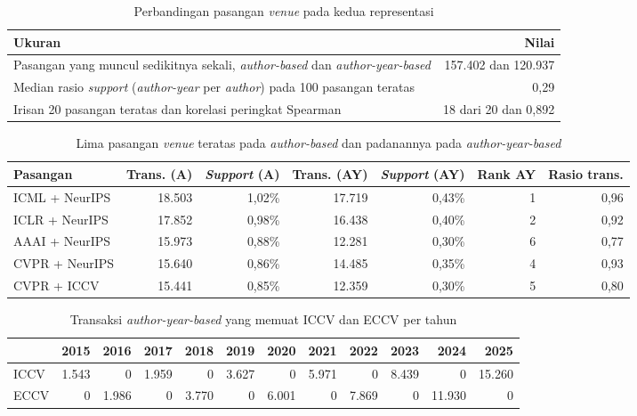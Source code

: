 \begin{table}[!htb]
\caption{Perbandingan pasangan \textit{venue} pada kedua representasi}
\label{tab:banding-repr}
\small
\begin{tabular*}{\textwidth}{@{\extracolsep{\fill}}@{}lr@{}}
\toprule
\textbf{Ukuran} & \textbf{Nilai} \\
\midrule
Pasangan yang muncul sedikitnya sekali, \textit{author-based} dan \textit{author-year-based} & 157.402 dan 120.937 \\
Median rasio \textit{support} (\textit{author-year} per \textit{author}) pada 100 pasangan teratas & 0,29 \\
Irisan 20 pasangan teratas dan korelasi peringkat Spearman & 18 dari 20 dan 0,892 \\
\bottomrule
\end{tabular*}
\end{table}

\begin{table}[!htb]
\caption{Lima pasangan \textit{venue} teratas pada \textit{author-based} dan padanannya pada \textit{author-year-based}}
\label{tab:top-pasangan}
\footnotesize
\begin{tabularx}{\textwidth}{@{}>{\raggedright\arraybackslash}X rrrrrr@{}}
\toprule
\textbf{Pasangan} & \textbf{Trans. (A)} & \textbf{\textit{Support} (A)} & \textbf{Trans. (AY)} & \textbf{\textit{Support} (AY)} & \textbf{Rank AY} & \textbf{Rasio trans.} \\
\midrule
ICML + NeurIPS & 18.503 & 1,02\% & 17.719 & 0,43\% & 1 & 0,96 \\
ICLR + NeurIPS & 17.852 & 0,98\% & 16.438 & 0,40\% & 2 & 0,92 \\
AAAI + NeurIPS & 15.973 & 0,88\% & 12.281 & 0,30\% & 6 & 0,77 \\
CVPR + NeurIPS & 15.640 & 0,86\% & 14.485 & 0,35\% & 4 & 0,93 \\
CVPR + ICCV & 15.441 & 0,85\% & 12.359 & 0,30\% & 5 & 0,80 \\
\bottomrule
\end{tabularx}
\end{table}

\begin{table}[!htb]
\caption{Transaksi \textit{author-year-based} yang memuat ICCV dan ECCV per tahun}
\label{tab:iccv}
\footnotesize
\setlength{\tabcolsep}{3.5pt}
\begin{tabular*}{\textwidth}{@{\extracolsep{\fill}}@{}lrrrrrrrrrrr@{}}
\toprule
 & \textbf{2015} & \textbf{2016} & \textbf{2017} & \textbf{2018} & \textbf{2019} & \textbf{2020} & \textbf{2021} & \textbf{2022} & \textbf{2023} & \textbf{2024} & \textbf{2025} \\
\midrule
ICCV & 1.543 & 0 & 1.959 & 0 & 3.627 & 0 & 5.971 & 0 & 8.439 & 0 & 15.260 \\
ECCV & 0 & 1.986 & 0 & 3.770 & 0 & 6.001 & 0 & 7.869 & 0 & 11.930 & 0 \\
\bottomrule
\end{tabular*}
\end{table}

